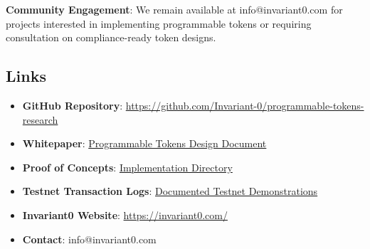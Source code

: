 \medskip{}

\noindent{}\textbf{Community Engagement}: We remain available at info@invariant0.com for projects interested in implementing programmable tokens or requiring consultation on compliance-ready token designs.

\subsection{Links}
\begin{itemize}
\item \textbf{GitHub Repository}: \url{https://github.com/Invariant-0/programmable-tokens-research}
\item \textbf{Whitepaper}: \href{https://github.com/Invariant-0/programmable-tokens-research/blob/main/whitepaper.pdf}{Programmable Tokens Design Document}
\item \textbf{Proof of Concepts}: \href{https://github.com/Invariant-0/programmable-tokens-research/tree/main/proof-of-concept}{Implementation Directory}
\item \textbf{Testnet Transaction Logs}: \href{https://github.com/Invariant-0/programmable-tokens-research/tree/main/proof-of-concept/testnet-logs}{Documented Testnet Demonstrations}
\item \textbf{Invariant0 Website}: \url{https://invariant0.com/}
\item \textbf{Contact}: info@invariant0.com
\end{itemize}
